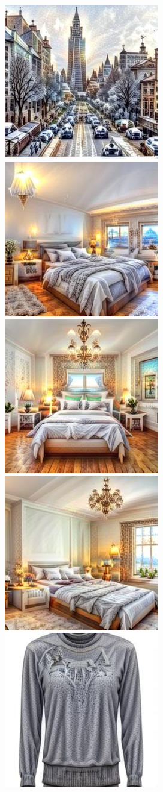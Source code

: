 \begin{figure}[h!]
\begin{subfigure}[t]{0.32\linewidth}
	\includegraphics[width=0.320\linewidth]{figs/samples_appendix_3/draft1k_cfg_2_ode_prompt_14_image_3.jpg}\\ 
	\includegraphics[width=0.320\linewidth]{figs/samples_appendix_3/draft1k_cfg_2_ode_prompt_19_image_1.jpg}\;%
	\includegraphics[width=0.320\linewidth]{figs/samples_appendix_3/draft1k_cfg_2_ode_prompt_19_image_2.jpg}\;%
	\includegraphics[width=0.320\linewidth]{figs/samples_appendix_3/draft1k_cfg_2_ode_prompt_19_image_3.jpg}\\ 
	\includegraphics[width=0.320\linewidth]{figs/samples_appendix_3/draft1k_cfg_2_ode_prompt_28_image_1.jpg}\;%

\end{subfigure}
\end{figure}
